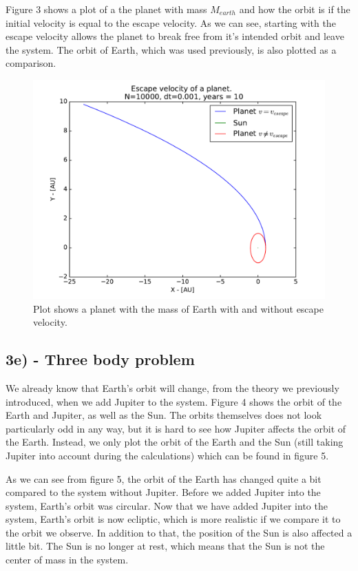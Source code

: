 \documentclass[12pt]{article}
\begin{document}
Figure 3 shows a plot of a the planet with mass $M_{earth}$ and how the orbit is if the initial velocity is equal to the escape velocity. As we can see, starting with the escape velocity allows the planet to break free from it's intended orbit and leave the system. The orbit of Earth, which was used previously, is also plotted as a comparison.

\begin{figure}[hbtp]
\centering
\includegraphics[width=\linewidth]{Plots/Escape_velocity.pdf}
\caption{Plot shows a planet with the mass of Earth with and without escape velocity.}
\end{figure}

\newpage 
\subsection*{3e) - Three body problem}
We already know that Earth's orbit will change, from the theory we previously introduced, when we add Jupiter to the system. Figure 4 shows the orbit of the Earth and Jupiter, as well as the Sun. The orbits themselves does not look particularly odd in any way, but it is hard to see how Jupiter affects the orbit of the Earth. Instead, we only plot the orbit of the Earth and the Sun (still taking Jupiter into account during the calculations) which can be found in figure 5. 

As we can see from figure 5, the orbit of the Earth has changed quite a bit compared to the system without Jupiter. Before we added Jupiter into the system, Earth's orbit was circular. Now that we have added Jupiter into the system, Earth's orbit is now ecliptic, which is more realistic if we compare it to the orbit we observe. In addition to that, the position of the Sun is also affected a little bit. The Sun is no longer at rest, which means that the Sun is not the center of mass in the system.
\end{document}
